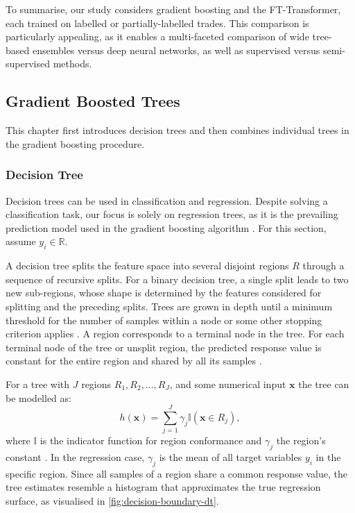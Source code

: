 To summarise, our study considers gradient boosting and the FT-Transformer, each trained on labelled or partially-labelled trades. This comparison is particularly appealing, as it enables a multi-faceted comparison of wide tree-based ensembles versus deep neural networks, as well as supervised versus semi-supervised methods.

\subsection{Gradient Boosted Trees}\label{sec:gradient-boosted-trees}

This chapter first introduces decision trees and then combines individual trees in the gradient boosting procedure.

\subsubsection{Decision Tree}\label{sec:decision-tree}

Decision trees can be used in classification and regression. Despite solving a classification task, our focus is solely on regression trees, as it is the prevailing prediction model used in the gradient boosting algorithm \autocite[][9]{friedmanAdditiveLogisticRegression2000}. For this section, assume $y_i \in \mathbb{R}$.

A decision tree splits the feature space into several disjoint regions $R$ through a sequence of recursive splits. For a binary decision tree, a single split leads to two new sub-regions, whose shape is determined by the features considered for splitting and the preceding splits. Trees are grown in depth until a minimum threshold for the number of samples within a node or some other stopping criterion applies \autocite[][42]{breimanClassificationRegressionTrees2017}.
A region corresponds to a terminal node in the tree. For each terminal node of the tree or unsplit region, the predicted response value is constant for the entire region and shared by all its samples \autocite[][229]{breimanClassificationRegressionTrees2017}.

For a tree with $J$ regions $R_1, R_2,\ldots, R_J$, and some numerical input $\mathbf{x}$ the tree can be modelled as:
\begin{equation}
    h(\mathbf{x})=\sum_{j=1}^{J} \gamma_{j} \mathbb{I}\left(\mathbf{x} \in R_{j}\right),
    \label{eq:decision-tree}
\end{equation}
where $\mathbb{I}$ is the indicator function for region conformance and $\gamma_j$ the region's constant \autocite[][326]{hastietrevorElementsStatisticalLearning2009}. In the regression case, $\gamma_j$ is the mean of all target variables $y_i$ in the specific region. Since all samples of a region share a common response value, the tree estimates resemble a histogram that approximates the true regression surface, as visualised in \cref{fig:decision-boundary-dt}.

